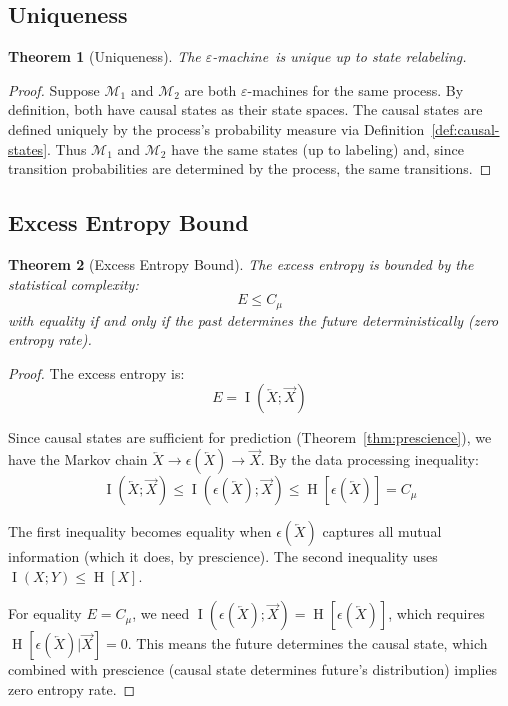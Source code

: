 \documentclass[11pt,twocolumn]{article}
\theoremstyle{plain}
\newtheorem{theorem}{Theorem}[section]
\theoremstyle{definition}
\theoremstyle{remark}
\newcommand{\eps}{\varepsilon}
\newcommand{\eM}{$\eps$-machine}
\newcommand{\Cmu}{C_\mu}
\newcommand{\calM}{\mathcal{M}}
\newcommand{\Past}{\overleftarrow{X}}
\newcommand{\Future}{\overrightarrow{X}}
\DeclareMathOperator{\Ent}{H}
\DeclareMathOperator{\MI}{I}
\begin{document}
\subsection{Uniqueness}

\begin{theorem}[Uniqueness]
\label{thm:uniqueness}
The \eM\ is unique up to state relabeling.
\end{theorem}
\begin{proof}
Suppose $\calM_1$ and $\calM_2$ are both \eM s for the same process. By definition, both have causal states as their state spaces. The causal states are defined uniquely by the process's probability measure via Definition~\ref{def:causal-states}. Thus $\calM_1$ and $\calM_2$ have the same states (up to labeling) and, since transition probabilities are determined by the process, the same transitions.
\end{proof}

\subsection{Excess Entropy Bound}

\begin{theorem}[Excess Entropy Bound]
\label{thm:bound}
The excess entropy is bounded by the statistical complexity:
\begin{equation}
    E \leq \Cmu
\end{equation}
with equality if and only if the past determines the future deterministically (zero entropy rate).
\end{theorem}
\begin{proof}
The excess entropy is:
\begin{equation}
    E = \MI(\Past; \Future)
\end{equation}

Since causal states are sufficient for prediction (Theorem~\ref{thm:prescience}), we have the Markov chain $\Past \to \epsilon(\Past) \to \Future$. By the data processing inequality:
\begin{equation}
    \MI(\Past; \Future) \leq \MI(\epsilon(\Past); \Future) \leq \Ent[\epsilon(\Past)] = \Cmu
\end{equation}

The first inequality becomes equality when $\epsilon(\Past)$ captures all mutual information (which it does, by prescience). The second inequality uses $\MI(X;Y) \leq \Ent[X]$.

For equality $E = \Cmu$, we need $\MI(\epsilon(\Past); \Future) = \Ent[\epsilon(\Past)]$, which requires $\Ent[\epsilon(\Past) | \Future] = 0$. This means the future determines the causal state, which combined with prescience (causal state determines future's distribution) implies zero entropy rate.
\end{proof}
\end{document}
